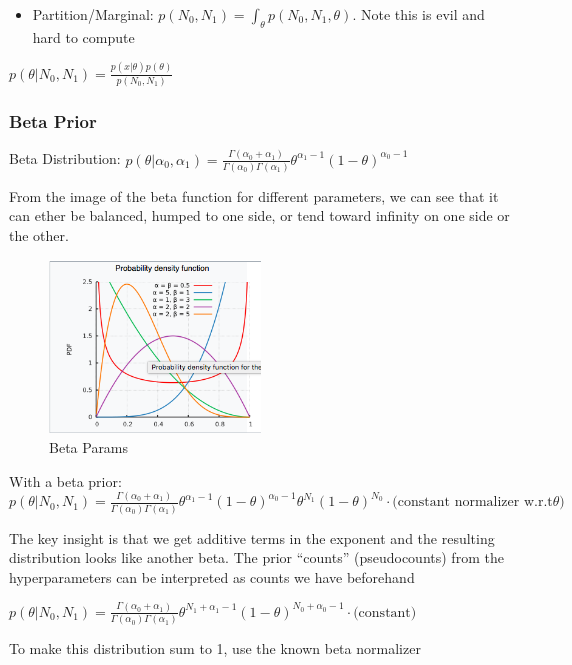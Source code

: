 \documentclass{article}
\begin{document}
\begin{itemize}
\item Partition/Marginal: $p(N_0,N_1) = \int_\theta p(N_0,N_1,\theta)$. Note this is evil and hard to compute
\end{itemize}
$p(\theta|N_0,N_1) = \frac{p(x|\theta) p(\theta)}{p(N_0,N_1)}$

\subsubsection*{Beta Prior}

Beta Distribution: $p(\theta|\alpha_0,\alpha_1) = \frac{\Gamma(\alpha_0 + \alpha_1)}{\Gamma(\alpha_0)\Gamma(\alpha_1)} \theta^{\alpha_1-1} (1-\theta)^{\alpha_0-1}$ 

From the image of the beta function for different parameters, we can see that it can ether be balanced, humped to one side, or tend toward infinity on one side or the other.
\begin{figure}
\centering
\includegraphics[width=0.5\textwidth]{./beta.png}
\caption{Beta Params}
\end{figure}

With a beta prior:  $p(\theta|N_0,N_1) = \frac{\Gamma(\alpha_0 + \alpha_1)}{\Gamma(\alpha_0)\Gamma(\alpha_1)} \theta^{\alpha_1-1} (1-\theta)^{\alpha_0-1} \theta^{N_1}(1-\theta)^{N_0} \cdot \textrm{(constant normalizer w.r.t} \theta) $

The key insight is that we get additive terms in the exponent and the resulting distribution looks like another beta. The prior ``counts'' (pseudocounts) from the hyperparameters can be interpreted as counts we have beforehand

$p(\theta|N_0,N_1) = \frac{\Gamma(\alpha_0 + \alpha_1)}{\Gamma(\alpha_0)\Gamma(\alpha_1)} \theta^{N_1 + \alpha_1-1} (1-\theta)^{N_0 + \alpha_0-1} \cdot \textrm{(constant)}$ 

To make this distribution sum to 1, use the known beta normalizer
\end{document}

